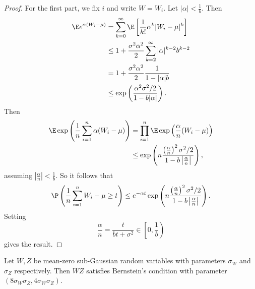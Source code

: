 \documentclass[a4paper]{article}
\begin{document}
\begin{proof}
  For the first part, we fix $i$ and write $W = W_i$. Let $|\alpha| < \frac{1}{b}$. Then
  \begin{align*}
    \E e^{\alpha(W_i - \mu)} &= \sum_{k = 0}^\infty \E \left[\frac{1}{k!} \alpha^k |W_i - \mu|^k\right]\\
    &\leq 1 + \frac{\sigma^2 \alpha^2}{2} \sum_{k = 2}^\infty |\alpha|^{k - 2} b^{k - 2}\\
    &= 1 + \frac{\sigma^2 \alpha^2}{2} \frac{1}{1 - |\alpha|b}\\
    &\leq \exp \left(\frac{\alpha^2 \sigma^2/2}{1 - b|\alpha|}\right).
  \end{align*}
  Then
  \begin{align*}
    \E \exp\left(\frac{1}{n} \sum_{i = 1}^n \alpha (W_i - \mu)\right) &= \prod_{i = 1}^n \E \exp\left(\frac{\alpha}{n} (W_i - \mu)\right)\\
    &\leq \exp \left(n \frac{\left(\frac{\alpha}{n}\right)^2 \sigma^2/2}{1 - b \left|\frac{\alpha}{n}\right|}\right),
  \end{align*}
  assuming $\left|\frac{\alpha}{n}\right| < \frac{1}{b}$. So it follows that
  \[
    \P \left(\frac{1}{n} \sum_{i = 1}^n W_i - \mu \geq t\right) \leq e^{-\alpha t}\exp \left(n \frac{\left(\frac{\alpha}{n}\right)^2 \sigma^2/2}{1 - b \left|\frac{\alpha}{n}\right|}\right).
  \]
  Setting
  \[
    \frac{\alpha}{n} = \frac{t}{bt + \sigma^2} \in \left[0, \frac{1}{b}\right)
  \]
  gives the result.
\end{proof}

\begin{lemma}
  Let $W, Z$ be mean-zero sub-Gaussian random variables with parameters $\sigma_W$ and $\sigma_Z$ respectively. Then $WZ$ satisfies Bernstein's condition with parameter $(8 \sigma_W \sigma_Z, 4 \sigma_W \sigma_Z)$.
\end{lemma}
\end{document}
